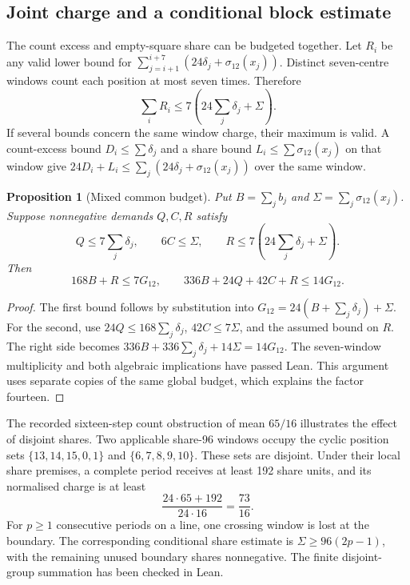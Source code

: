 \documentclass[11pt,a4paper]{article}
\newtheorem{proposition}[theorem]{Proposition}
\theoremstyle{definition}
\theoremstyle{remark}
\begin{document}
\subsection{Joint charge and a conditional block estimate}
The count excess and empty-square share can be budgeted together. Let $R_i$ be any valid lower bound for $\sum_{j=i+1}^{i+7}(24\delta_j+\sigma_{12}(x_j))$. Distinct seven-centre windows count each position at most seven times. Therefore
\[
\sum_i R_i\le7\left(24\sum_j\delta_j+\Sigma\right).
\]
If several bounds concern the same window charge, their maximum is valid. A count-excess bound $D_i\le\sum\delta_j$ and a share bound $L_i\le\sum\sigma_{12}(x_j)$ on that window give $24D_i+L_i\le\sum_j(24\delta_j+\sigma_{12}(x_j))$ over the same window.

\begin{proposition}[Mixed common budget]\label{prop:mixed-common-budget}
Put $B=\sum_jb_j$ and $\Sigma=\sum_j\sigma_{12}(x_j)$. Suppose nonnegative
demands $Q,C,R$ satisfy
\[
Q\le7\sum_j\delta_j,\qquad6C\le\Sigma,\qquad
R\le7\left(24\sum_j\delta_j+\Sigma\right).
\]
Then
\[
168B+R\le7G_{12},\qquad
336B+24Q+42C+R\le14G_{12}.
\]
\end{proposition}
\begin{proof}
The first bound follows by substitution into $G_{12}=24(B+\sum_j\delta_j)+\Sigma$. For the second, use $24Q\le168\sum_j\delta_j$, $42C\le7\Sigma$, and the assumed bound on $R$. The right side becomes $336B+336\sum_j\delta_j+14\Sigma=14G_{12}$. The seven-window multiplicity and both algebraic implications have passed Lean. This argument uses separate copies of the same global budget, which explains the factor fourteen.
\end{proof}

The recorded sixteen-step count obstruction of mean $65/16$ illustrates the effect of disjoint shares. Two applicable share-96 windows occupy the cyclic position sets $\{13,14,15,0,1\}$ and $\{6,7,8,9,10\}$. These sets are disjoint. Under their local share premises, a complete period receives at least 192 share units, and its normalised charge is at least
\[
\frac{24\cdot65+192}{24\cdot16}=\frac{73}{16}.
\]
For $p\ge1$ consecutive periods on a line, one crossing window is lost at the boundary. The corresponding conditional share estimate is $\Sigma\ge96(2p-1)$, with the remaining unused boundary shares nonnegative. The finite disjoint-group summation has been checked in Lean.
\end{document}
